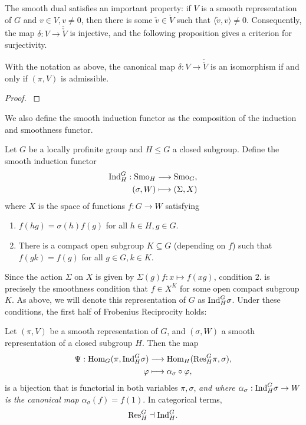 The smooth dual satisfies an important property: if $V$ is a smooth representation of $G$ and $v\in V, v\neq 0$, then there is some $\check{v}\in\check{V}$ such that $\langle\check{v},v\rangle\neq 0$. Consequently, the map $\delta:V\rightarrow\check{\check{V}}$ is injective, and the following proposition gives a criterion for surjectivity.

\begin{prop}
    With the notation as above, the canonical map $\delta:V\longrightarrow\check\check{V}$ is an isomorphism if and only if $(\pi,V)$ is admissible.
\end{prop}
\begin{proof}
    \cite[2.9 Proposition]{BH1}
\end{proof}

We also define the smooth induction functor as the composition of the induction and smoothness functor.

\begin{defn}\label{induction}
    Let $G$ be a locally profinite group and $H\leq G$ a closed subgroup. Define the smooth induction functor
    \begin{align*}
        \mathrm{Ind}_H^G:\mathrm{Smo}_H&\longrightarrow\mathrm{Smo}_G,\\
        (\sigma,W)&\longmapsto(\Sigma,X)
    \end{align*}
    where $X$ is the space of functions $f: G\to W$ satisfying
	\begin{enumerate}
		\item $f(hg) = \sigma(h)f(g)$ for all $h\in H, g\in G$.
		\item There is a compact open subgroup $K\subseteq G$ (depending on $f$) such that $f(gk) = f(g)$ for all $g\in G, k\in K$.
	\end{enumerate}
\end{defn}

Since the action $\Sigma$ on $X$ is given by $\Sigma(g)f:x\mapsto f(xg)$, condition $2.$ is precisely the smoothness condition that $f\in X^K$ for some open compact subgroup $K$. As above, we will denote this representation of $G$ as $\mathrm{Ind}_H^G\sigma$. Under these conditions, the first half of Frobenius Reciprocity holds:

\begin{thm}
	Let $(\pi,V)$ be a smooth representation of $G$, and $(\sigma,W)$ a smooth representation of a closed subgroup $H$. Then the map
	\begin{align*}
		\Psi:\mathrm{Hom}_G(\pi, \mathrm{Ind}_H^G\sigma)&\longrightarrow \mathrm{Hom}_H(\mathrm{Res}_H^G \pi, \sigma),\\
		\varphi &\longmapsto \alpha_\sigma \circ \varphi,
	\end{align*}
    is a bijection that is functorial in both variables $\pi,\sigma$, \textit{and where $\alpha_\sigma:\mathrm{Ind}_H^G\sigma \to W$ is the canonical map $\alpha_\sigma(f) = f(1)$}. In categorical terms,
    $$\mathrm{Res}_H^G\dashv\mathrm{Ind}_H^G.$$
\end{thm}

